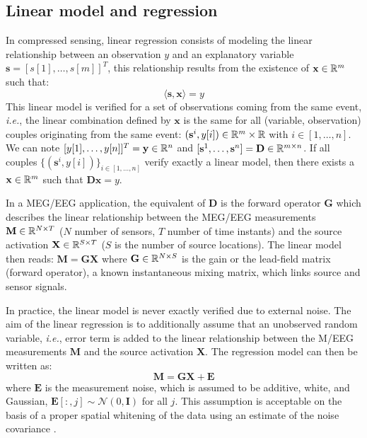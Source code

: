 \subsection{Linear model and regression}
In compressed sensing, linear regression consists of modeling the linear relationship between an observation $y$ and an explanatory variable $\mathbf{s}=[s[1],\dots ,s[m]]^T$, this relationship results from the existence of $\mathbf{x}\in\mathbb{R}^m$ such that:
\begin{equation} \label{eq_linreg}
	\langle\mathbf{s}, \mathbf{x}\rangle = y
\end{equation}
This linear model is verified for a set of observations coming from the same event, \textit{i.e.}, the linear combination defined by $\mathbf{x}$ is the same for all (variable, observation) couples originating from the same event: $(\mathbf{s}^i, y[i])\in\mathbb{R}^m\times\mathbb{R}$ with $i\in [1,\dots ,n]$. We can note $[y[1], \dots ,y[n]]^T=\mathbf{y}\in\mathbb{R}^n$ and $[\mathbf{s}^1,\dots ,\mathbf{s}^n]=\mathbf{D}\in\mathbb{R}^{m\times n}$. If all couples $\{(\mathbf{s}^i,y[i])\}_{i\in [1,\dots ,n]}$ verify exactly a linear model, then there exists a $\mathbf{x}\in\mathbb{R}^m$ such that $\mathbf{Dx}=y$.

In a MEG/EEG application, the equivalent of $\mathbf{D}$ is the forward operator $\mathbf{G}$ which describes the linear relationship between the MEG/EEG measurements $\mathbf{M}\in\mathbb{R}^{N\times T}$ ($N$ number of sensors, $T$ number of time instants) and the source activation $\mathbf{X}\in\mathbb{R}^{S\times T}$ ($S$ is the number of source locations). The linear model then reads: $\mathbf{M} = \mathbf{GX}$ where $\mathbf{G}\in\mathbb{R}^{N\times S}$ is the gain or the lead-field matrix (forward operator), a known instantaneous mixing matrix, which links source and sensor signals. 

In practice, the linear model is never exactly verified due to external noise. The aim of the linear regression is to additionally assume that an unobserved random variable, \textit{i.e.}, error term is added to the linear relationship between the M/EEG measurements $\mathbf{M}$ and the source activation $\mathbf{X}$. The regression model can then be written as:
\begin{equation} \label{eq_linmeeg}
	\mathbf{M} = \mathbf{GX} + \mathbf{E}
\end{equation}
where $\mathbf{E}$ is the measurement noise, which is assumed to be additive, white, and Gaussian, \mbox{$\mathbf{E}[:,j]\sim\mathcal{N}(0,\mathbf{I})$} for all $j$. This assumption is acceptable on the basis of a proper spatial whitening of the data using an estimate of the noise covariance \cite{engemann2015automated}.

